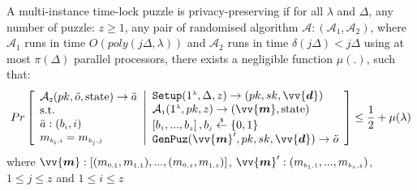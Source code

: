   
  
\begin{definition}\label{Def::Solution-Privacy} A multi-instance time-lock puzzle  is privacy-preserving  if for all $\lambda$ and  $\Delta$,  any number of puzzle: $z\geq1$, any pair of randomised algorithm $\mathcal{A} : (\mathcal{A}_{\scriptscriptstyle 1},\mathcal{A}_{\scriptscriptstyle 2})$, where $\mathcal{A}_{\scriptscriptstyle 1}$ runs in  time $O(poly(j\Delta,\lambda))$ and $\mathcal{A}_{\scriptscriptstyle 2}$ runs in  time $\delta(j\Delta)<j\Delta$ using at most $\pi(\Delta)$ parallel processors, there exists a negligible function $\mu(.)$, such that: 
\small{
$$ Pr\left[  \begin{array}{l} 
 \mathcal{A}_{\scriptscriptstyle 2}(pk,\ddot{o},\text{state})\rightarrow \ddot{a}\\
 \text{s.t.}\\
\ddot{a}:(b_{\scriptscriptstyle i},i)\\
  m_{\scriptscriptstyle b_{\scriptscriptstyle i},i}=m_{\scriptscriptstyle b_{\scriptscriptstyle j},j} 
  \end{array}
 \middle |
    \begin{array}{l}
\mathtt{Setup}(1^{\scriptscriptstyle\lambda},\Delta,z)\rightarrow (pk,sk,\vv{\bm{d}})\\
\mathcal{A}_{\scriptscriptstyle 1}(1^{\scriptscriptstyle\lambda},pk,z)\rightarrow (\vv{\bm{m}},\text{state})\\
\left[b_{\scriptscriptstyle 1},...,b_{\scriptscriptstyle z}\right], b_{\scriptscriptstyle j}\stackrel{\scriptscriptstyle\$}\leftarrow \{0,1\}\\
\mathtt {GenPuz}(\vv{\bm{m}}', pk, sk,\vv{\bm{d}})\rightarrow \ddot{o}\\
\end{array}    \right]\leq \frac{1}{2}+\mu(\lambda)$$
}
where  $\vv{\bm{m}}: [(m_{\scriptscriptstyle 0,1},m_{\scriptscriptstyle 1,1}),...,(m_{\scriptscriptstyle 0,z},m_{\scriptscriptstyle 1,z})]$, $\vv{\bm{m}}':(m_{\scriptscriptstyle b_{\scriptscriptstyle 1},\scriptscriptstyle 1},..., m_{\scriptscriptstyle b_{\scriptscriptstyle z},\scriptscriptstyle z})$, $1\leq j\leq z$ and $1\leq i\leq z$
\end{definition}

